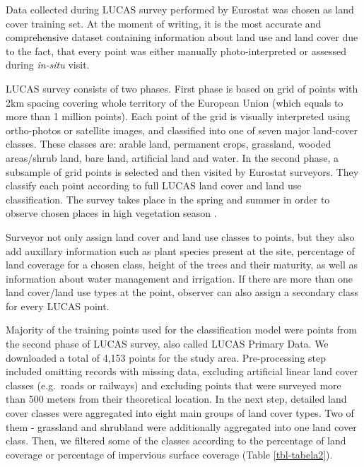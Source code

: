 \documentclass{amuthesis}
\begin{document}
Data collected during LUCAS survey performed by Eurostat was chosen as
land cover training set. At the moment of writing, it is the most
accurate and comprehensive dataset containing information about land use
and land cover \autocite{pflugmacher2019} due to the fact, that every
point was either manually photo-interpreted or assessed during
\emph{in-situ} visit.

LUCAS survey consists of two phases. First phase is based on grid of
points with 2km spacing covering whole territory of the European Union
(which equals to more than 1 million points). Each point of the grid is
visually interpreted using ortho-photos or satellite images, and
classified into one of seven major land-cover classes. These classes
are: arable land, permanent crops, grassland, wooded areas/shrub land,
bare land, artificial land and water. In the second phase, a subsample
of grid points is selected and then visited by Eurostat surveyors. They
classify each point according to full LUCAS land cover and land use
classification. The survey takes place in the spring and summer in order
to observe chosen places in high vegetation season
\autocite{dandrimont2020}.

Surveyor not only assign land cover and land use classes to points, but
they also add auxillary information such as plant species present at the
site, percentage of land coverage for a chosen class, height of the
trees and their maturity, as well as information about water management
and irrigation. If there are more than one land cover/land use types at
the point, observer can also assign a secondary class for every LUCAS
point.

Majority of the training points used for the classification model were
points from the second phase of LUCAS survey, also called LUCAS Primary
Data. We downloaded a total of 4,153 points for the study area.
Pre-processing step included omitting records with missing data,
excluding artificial linear land cover classes (e.g.~roads or railways)
and excluding points that were surveyed more than 500 meters from their
theoretical location. In the next step, detailed land cover classes were
aggregated into eight main groups of land cover types. Two of them -
grassland and shrubland were additionally aggregated into one land cover
class. Then, we filtered some of the classes according to the percentage
of land coverage or percentage of impervious surface coverage (Table
\ref{tbl-tabela2}).
\end{document}
